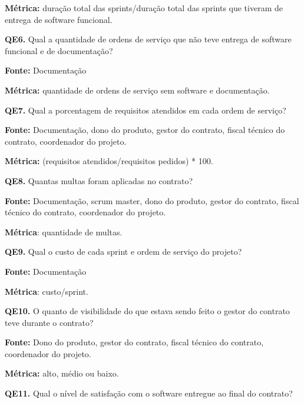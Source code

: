 \textbf{Métrica:} duração total das sprints/duração total das sprints que tiveram de entrega de software funcional.

 \vspace{\onelineskip} 

\textbf{QE6.} Qual a quantidade de ordens de serviço que não teve entrega de software funcional e de documentação?

\textbf{Fonte:} Documentação

\textbf{Métrica:} quantidade de ordens de serviço sem software e documentação.

 \vspace{\onelineskip} 
 
\textbf{QE7.} Qual a porcentagem de requisitos atendidos em cada ordem de serviço?

\textbf{Fonte:} Documentação, dono do produto, gestor do contrato, fiscal técnico do contrato, coordenador do projeto.

\textbf{Métrica:} (requisitos atendidos/requisitos pedidos) * 100.
 
 \vspace{\onelineskip} 

\textbf{QE8.} Quantas multas foram aplicadas no contrato?

\textbf{Fonte:} Documentação, scrum master, dono do produto, gestor do contrato, fiscal técnico do contrato, coordenador do projeto.

\textbf{Métrica}: quantidade de multas.

 \vspace{\onelineskip}  

\textbf{QE9.} Qual o custo de cada sprint e ordem de serviço do projeto?

\textbf{Fonte:} Documentação

\textbf{Métrica}: custo/sprint.

 \vspace{\onelineskip}  

\textbf{QE10.} O quanto de visibilidade do que estava sendo feito o gestor do contrato teve durante o contrato?

\textbf{Fonte:} Dono do produto, gestor do contrato, fiscal técnico do contrato, coordenador do projeto.

\textbf{Métrica:} alto, médio ou baixo. 
 
 \vspace{\onelineskip} 

\textbf{QE11.} Qual o nível de satisfação com o software entregue ao final do contrato?


